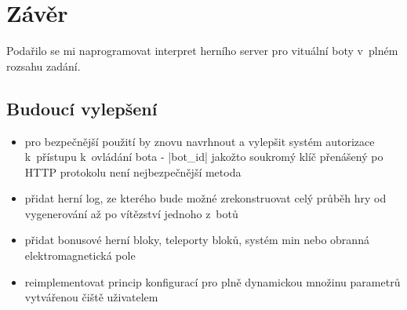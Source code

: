 \section*{Závěr}

Podařilo se mi naprogramovat interpret herního server pro vituální boty v~plném rozsahu zadání.

\subsection*{Budoucí vylepšení}

\begin{itemize}
 \item pro bezpečnější použití by znovu navrhnout a vylepšit systém autorizace k~přístupu k~ovládání bota - \ic|bot_id| jakožto soukromý klíč přenášený po HTTP protokolu není nejbezpečnější metoda
 \item přidat herní log, ze kterého bude možné zrekonstruovat celý průběh hry od vygenerování až po vítězství jednoho z~botů  
 \item přidat bonusové herní bloky, teleporty bloků, systém min nebo obranná elektromagnetická pole
 \item reimplementovat princip konfigurací pro plně dynamickou množinu parametrů vytvářenou čiště uživatelem
\end{itemize}

